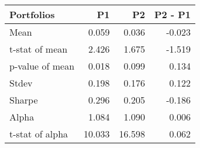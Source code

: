 \begin{tabular}{lrrr}
\toprule
Portfolios & P1 & P2 & P2 - P1 \\
\midrule
Mean & 0.059 & 0.036 & -0.023 \\
t-stat of mean & 2.426 & 1.675 & -1.519 \\
p-value of mean & 0.018 & 0.099 & 0.134 \\
Stdev & 0.198 & 0.176 & 0.122 \\
Sharpe & 0.296 & 0.205 & -0.186 \\
Alpha & 1.084 & 1.090 & 0.006 \\
t-stat of alpha & 10.033 & 16.598 & 0.062 \\
\bottomrule
\end{tabular}
